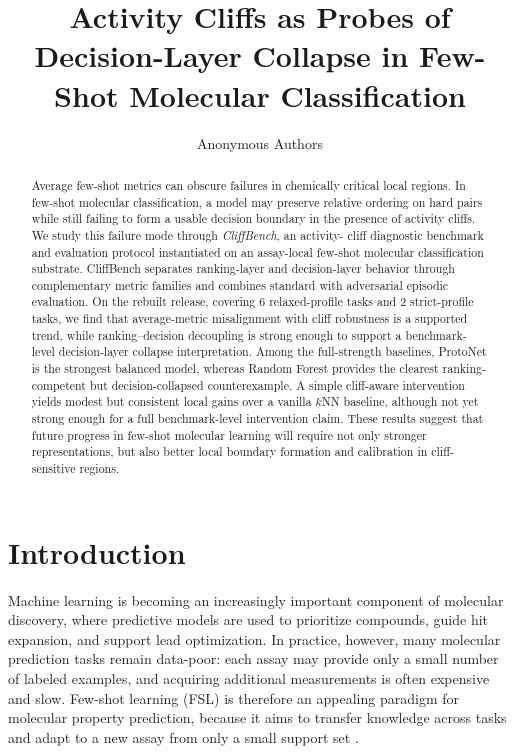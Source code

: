 \documentclass{article}
\title{Activity Cliffs as Probes of Decision-Layer Collapse in Few-Shot Molecular Classification}
\author{Anonymous Authors}
\date{}
\begin{document}
\maketitle

\begin{abstract}
Average few-shot metrics can obscure failures in chemically critical local regions. In few-shot molecular
classification, a model may preserve relative ordering on hard pairs while still failing to form a usable decision
boundary in the presence of activity cliffs. We study this failure mode through \emph{CliffBench}, an activity-
cliff diagnostic benchmark and evaluation protocol instantiated on an assay-local few-shot molecular classification
substrate. CliffBench separates ranking-layer and decision-layer behavior through complementary metric families and
combines standard with adversarial episodic evaluation. On the rebuilt release, covering $6$ relaxed-profile tasks
and $2$ strict-profile tasks, we find that average-metric misalignment with cliff robustness is a supported trend,
while ranking--decision decoupling is strong enough to support a benchmark-level decision-layer collapse
interpretation. Among the full-strength baselines, ProtoNet is the strongest balanced model, whereas Random Forest
provides the clearest ranking-competent but decision-collapsed counterexample. A simple cliff-aware intervention
yields modest but consistent local gains over a vanilla $k$NN baseline, although not yet strong enough for a full
benchmark-level intervention claim. These results suggest that future progress in few-shot molecular learning will
require not only stronger representations, but also better local boundary formation and calibration in
cliff-sensitive regions.
\end{abstract}

\section{Introduction}

Machine learning is becoming an increasingly important component of molecular discovery, where predictive models
are used to prioritize compounds, guide hit expansion, and support lead optimization. In practice, however, many
molecular prediction tasks remain data-poor: each assay may provide only a small number of labeled examples, and
acquiring additional measurements is often expensive and slow. Few-shot learning (FSL) is therefore an appealing
paradigm for molecular property prediction, because it aims to transfer knowledge across tasks and adapt to a new
assay from only a small support set \cite{fsmol,protonet,maml}.
\end{document}
